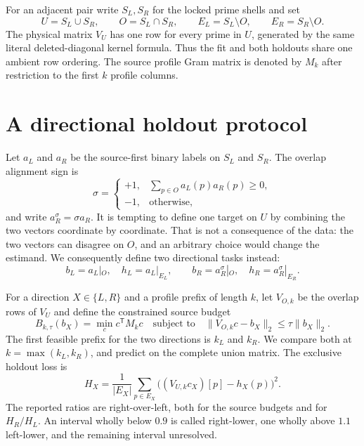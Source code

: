 \documentclass[11pt]{article}
\begin{document}
For an adjacent pair write $S_L,S_R$ for the locked prime shells and set
\[
 U=S_L\cup S_R,\qquad O=S_L\cap S_R,\qquad
 E_L=S_L\setminus O,\qquad E_R=S_R\setminus O.                 \tag{1}
\]
The physical matrix $V_U$ has one row for every prime in $U$, generated by the
same literal deleted-diagonal kernel formula.  Thus the fit and both holdouts
share one ambient row ordering.  The source profile Gram matrix is denoted by
$M_k$ after restriction to the first $k$ profile columns.

\section{A directional holdout protocol}

Let $a_L$ and $a_R$ be the source-first binary labels on $S_L$ and $S_R$.
The overlap alignment sign is
\[
 \sigma=\begin{cases}
 +1,&\displaystyle\sum_{p\in O}a_L(p)a_R(p)\geq0,\\
 -1,&\text{otherwise},
 \end{cases}                                                   \tag{2}
\]
and write $a_R^\sigma=\sigma a_R$.  It is tempting to define one target on
$U$ by combining the two vectors coordinate by coordinate.  That is not a
consequence of the data: the two vectors can disagree on $O$, and an arbitrary
choice would change the estimand.  We consequently define two directional
tasks instead:
\[
 b_L=a_L|_O,\quad h_L=a_L|_{E_L},\qquad
 b_R=a_R^\sigma|_O,\quad h_R=a_R^\sigma|_{E_R}.                 \tag{3}
\]

For a direction $X\in\{L,R\}$ and a profile prefix of length $k$, let
$V_{O,k}$ be the overlap rows of $V_U$ and define the constrained source
budget
\[
 B_{k,\tau}(b_X)=\min_c c^\mathsf{T}M_kc\quad\text{subject to}\quad
 \|V_{O,k}c-b_X\|_2\leq\tau\|b_X\|_2.                           \tag{4}
\]
The first feasible prefix for the two directions is $k_L$ and $k_R$.
We compare both at $k=\max(k_L,k_R)$, and predict on the complete union
matrix.  The exclusive holdout loss is
\[
 H_X=\frac{1}{|E_X|}\sum_{p\in E_X}
 \bigl((V_{U,k}c_X)[p]-h_X(p)\bigr)^2.                          \tag{5}
\]
The reported ratios are right-over-left, both for the source budgets and for
$H_R/H_L$.  An interval wholly below $0.9$ is called right-lower, one wholly
above $1.1$ left-lower, and the remaining interval unresolved.
\end{document}
